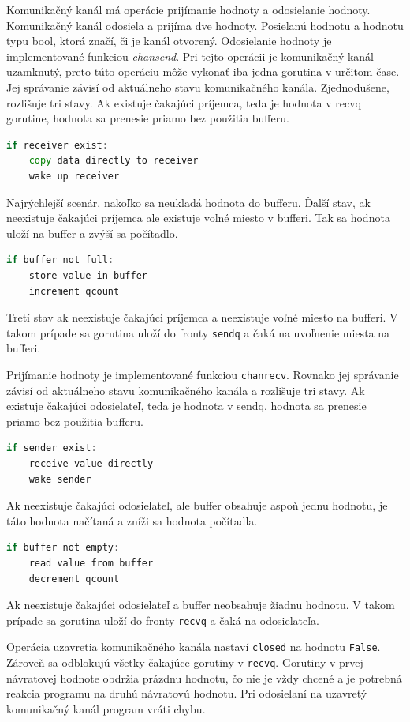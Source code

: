 \documentclass[
  biblatex,
  seconds=true,
  language=slovak,
  figures=false,
  urldate=iso,
  glossaries,
  index
]{kidiplom}
\begin{document}
Komunikačný kanál má operácie prijímanie hodnoty a odosielanie hodnoty. Komunikačný kanál odosiela a prijíma dve hodnoty. Posielanú
hodnotu a hodnotu typu bool, ktorá značí, či je kanál otvorený.
Odosielanie hodnoty je implementované funkciou \emph{chansend}. Pri tejto operácii je komunikačný kanál uzamknutý, preto túto
operáciu môže vykonať iba jedna gorutina v určitom čase.
Jej správanie závisí od aktuálneho stavu komunikačného kanála. Zjednodušene, rozlišuje tri stavy.
Ak existuje čakajúci príjemca, teda
je hodnota v recvq gorutine, hodnota sa prenesie priamo bez použitia bufferu.
\begin{lstlisting}[language=Go]
if receiver exist:
	copy data directly to receiver
	wake up receiver 	
\end{lstlisting}
Najrýchlejší scenár, nakoľko sa neukladá hodnota do bufferu. Ďalší stav, ak neexistuje čakajúci príjemca ale existuje voľné
miesto v bufferi. Tak sa hodnota uloží na buffer a zvýší sa počítadlo.
\begin{lstlisting}[language=Go]
if buffer not full:
	store value in buffer 
	increment qcount	
\end{lstlisting}
Tretí stav ak neexistuje čakajúci príjemca a neexistuje voľné miesto na bufferi. V takom prípade sa gorutina uloží do fronty
\texttt{sendq} a čaká na uvoľnenie miesta na bufferi.

Prijímanie hodnoty je implementované funkciou \texttt{chanrecv}. Rovnako jej správanie závisí od aktuálneho stavu komunikačného
kanála a rozlišuje tri stavy. Ak existuje čakajúci odosielateľ, teda je hodnota v sendq, hodnota sa prenesie priamo
bez použitia bufferu.
\begin{lstlisting}[language=Go]
if sender exist:
	receive value directly
	wake sender
\end{lstlisting}
Ak neexistuje čakajúci odosielateľ, ale buffer obsahuje aspoň jednu hodnotu, je táto hodnota načítaná a zníži sa hodnota počítadla.
\begin{lstlisting}[language=Go]
if buffer not empty:
	read value from buffer
	decrement qcount	
\end{lstlisting}
Ak neexistuje čakajúci odosielateľ a buffer neobsahuje žiadnu hodnotu. V takom prípade sa gorutina uloží do fronty \texttt{recvq}
a čaká na odosielateľa.

Operácia uzavretia komunikačného kanála nastaví \texttt{closed} na hodnotu \texttt{False}. Zároveň sa odblokujú všetky čakajúce gorutiny
v \texttt{recvq}. Gorutiny v prvej návratovej hodnote obdržia prázdnu hodnotu, čo nie je vždy chcené a je potrebná reakcia
programu na druhú návratovú hodnotu. Pri odosielaní na uzavretý komunikačný kanál program vráti chybu.
\end{document}
